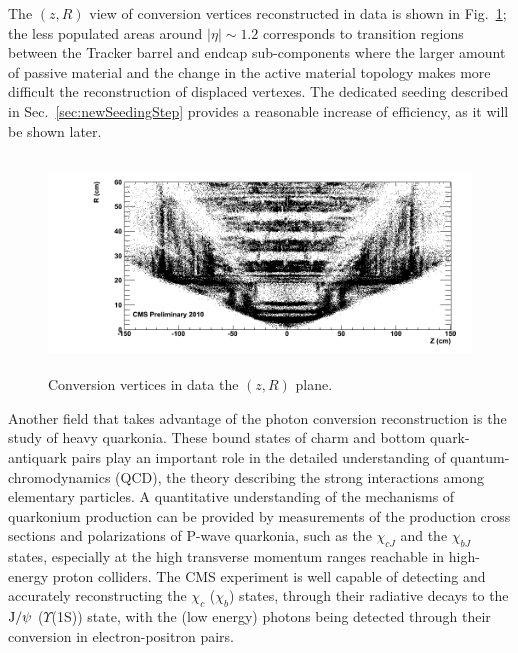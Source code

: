 \documentclass[a4paper]{jpconf}
\def \JPsi{\rm J/\psi}
\begin{document}
%
The  $(z, R)$  view of conversion vertices reconstructed in data is  shown in Fig.~\ref{fig:convRZ};  the less populated
areas  around $|\eta|\sim1.2$ corresponds to transition regions between the Tracker
barrel and endcap sub-components where the larger amount of passive material and the change in the active material topology makes more difficult the reconstruction of displaced vertexes. 
The dedicated seeding described in Sec.~\ref{sec:newSeedingStep} provides a reasonable increase of efficiency, as it will be shown later.


\begin{figure}[h!]
  \begin{center}
     \includegraphics[width=17cm,height=5.7cm]{fig/conversions/ptCut/data_rz.png}
      \caption{Conversion vertices in data the $(z,R)$ plane.}
    \label{fig:convRZ}
  \end{center}
\end{figure}



Another field that takes advantage of the photon conversion reconstruction is the study of heavy quarkonia. These bound states of charm and bottom quark-antiquark pairs play an important role in the detailed understanding of quantum-chromodynamics 
(QCD), the theory describing the strong interactions among elementary particles. 
A quantitative understanding of the mechanisms of quarkonium production can
be provided by measurements of the production cross sections and 
polarizations of P-wave quarkonia, such as the $\chi_{cJ}$ and the 
$\chi_{bJ}$ states, especially at the high transverse momentum ranges
reachable in high-energy proton colliders.
The CMS experiment is well capable 
of detecting and accurately reconstructing the $\chi_{c}$ ($\chi_{b}$)
states, through their radiative decays to the $\JPsi$ ($\Upsilon$(1S))
state, with the (low energy) photons being detected through their conversion 
in electron-positron pairs. 
\end{document}
